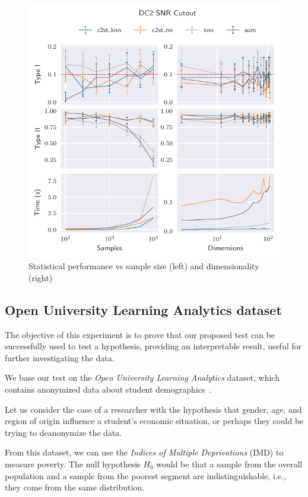 \begin{figure}[htbp]
    \centering
    \includegraphics{images/6_som/dc2_snr}
    \caption{Statistical performance vs sample size (left) and dimensionality (right)}
    \label{fig:dc2_snr}
\end{figure}

\subsection{Open University Learning Analytics dataset}
\label{subsec:som_oulad}
The objective of this experiment is to prove that our proposed test can be successfully
used to test a hypothesis, providing an interpretable result, useful for further
investigating the data.

We base our test on the \emph{Open University Learning Analytics}
dataset, which contains anonymized data about student demographics~\cite{kuzilek_open_2017}.

Let us consider the case of a researcher with the hypothesis that gender, age, and
region of origin influence a student's economic situation, or perhaps they could
be trying to deanonymize the data.

From this dataset, we can use the \emph{Indices of Multiple Deprivations} (IMD) to measure poverty.
The null hypothesis $H_0$ would be that a sample from the overall population and a sample from
the poorest segment are indistinguishable, i.e., they come from the same distribution.

